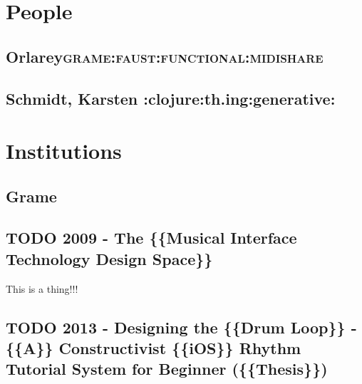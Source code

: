 \documentclass[11pt]{article}
\begin{document}
\section{People}
\label{sec:org4a52a54}
\subsection{Orlarey\hfill{}\textsc{grame:faust:functional:midishare}}
\label{sec:org8ff8db8}
\subsection{Schmidt, Karsten :clojure:th.ing:generative:}
\label{sec:org3793485}

\section{Institutions}
\label{sec:orgea1202e}
\subsection{Grame}
\label{sec:org144167f}

\subsection{{\bfseries\sffamily TODO} 2009 - The \{\{Musical Interface Technology Design Space\}\}}
\label{sec:orga89d64a}
\cite{overholt_musical_2009}

This is a thing!!!



\subsection{{\bfseries\sffamily TODO} 2013 - Designing the \{\{Drum Loop\}\} - \{\{A\}\} Constructivist \{\{iOS\}\} Rhythm Tutorial System for Beginner (\{\{Thesis\}\})}
\label{sec:orgd1efd46}
\cite{hein_designing_2013}

 

\end{document}
